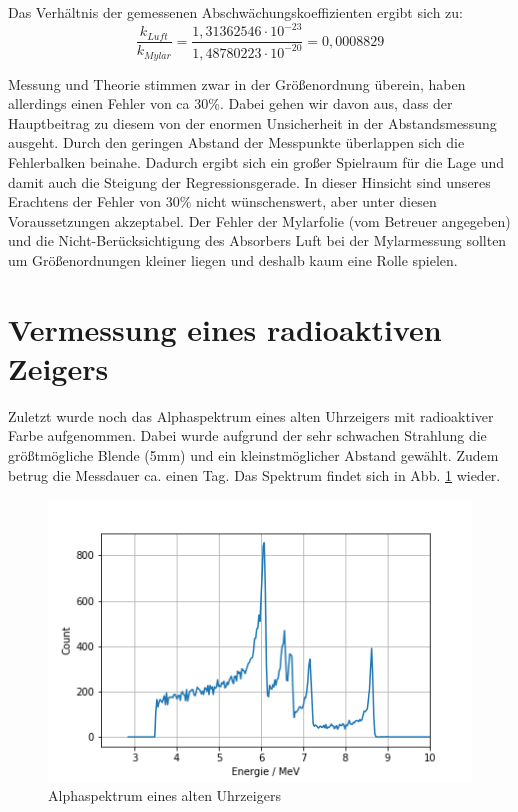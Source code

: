 Das Verhältnis der gemessenen Abschwächungskoeffizienten ergibt sich zu:\\

\begin{equation}
    \frac{k_{Luft}}{k_{Mylar}} = \frac{1,31362546 \cdot 10^{-23}}{1,48780223 \cdot 10^{-20}} = 0,0008829
\end{equation}

Messung und Theorie stimmen zwar in der Größenordnung überein, haben allerdings einen Fehler von ca 30\%. Dabei gehen wir davon aus, 
dass der Hauptbeitrag zu diesem von der enormen Unsicherheit in der Abstandsmessung ausgeht. Durch den geringen Abstand der Messpunkte 
überlappen sich die Fehlerbalken beinahe. Dadurch ergibt sich ein großer Spielraum für die Lage und damit auch die Steigung der 
Regressionsgerade. In dieser Hinsicht sind unseres Erachtens der Fehler von 30\% nicht wünschenswert, aber unter diesen Voraussetzungen 
akzeptabel. Der Fehler der Mylarfolie (vom Betreuer angegeben) und die Nicht-Berücksichtigung des Absorbers Luft bei der Mylarmessung 
sollten um Größenordnungen kleiner liegen und deshalb kaum eine Rolle spielen.






\section{Vermessung eines radioaktiven Zeigers}

Zuletzt wurde noch das Alphaspektrum eines alten Uhrzeigers mit radioaktiver Farbe aufgenommen. Dabei wurde aufgrund der sehr schwachen 
Strahlung die größtmögliche Blende (5mm) und ein kleinstmöglicher Abstand gewählt. Zudem betrug die Messdauer ca. einen Tag. Das 
Spektrum findet sich in Abb. \ref{bild:uhr} wieder. \\

\begin{figure}[h]
    \centering
    \includegraphics[scale=0.75]{Bilder/uhr.png}
    \caption{Alphaspektrum eines alten Uhrzeigers}
    \label{bild:uhr}
\end{figure}

